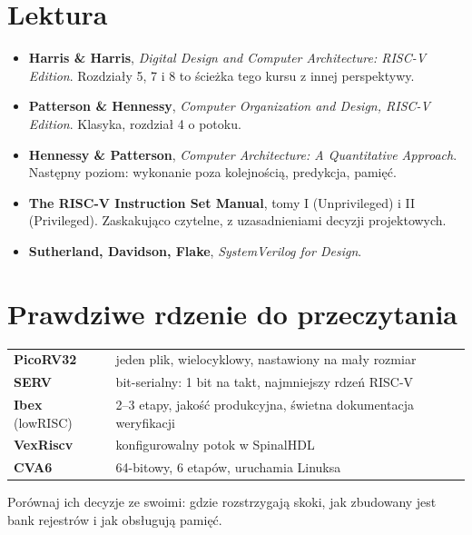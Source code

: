 \section{Lektura}

\begin{itemize}
  \item \textbf{Harris \& Harris}, \emph{Digital Design and Computer Architecture:
    RISC-V Edition}. Rozdziały 5, 7 i 8 to ścieżka tego kursu z innej perspektywy.
  \item \textbf{Patterson \& Hennessy}, \emph{Computer Organization and Design,
    RISC-V Edition}. Klasyka, rozdział 4 o potoku.
  \item \textbf{Hennessy \& Patterson}, \emph{Computer Architecture: A Quantitative
    Approach}. Następny poziom: wykonanie poza kolejnością, predykcja, pamięć.
  \item \textbf{The RISC-V Instruction Set Manual}, tomy I (Unprivileged) i II
    (Privileged). Zaskakująco czytelne, z uzasadnieniami decyzji projektowych.
  \item \textbf{Sutherland, Davidson, Flake}, \emph{SystemVerilog for Design}.
\end{itemize}

\section{Prawdziwe rdzenie do przeczytania}

\begin{center}
\small
\begin{tabularx}{\linewidth}{@{}l X@{}}
\toprule
\textbf{PicoRV32} & jeden plik, wielocyklowy, nastawiony na mały rozmiar \\
\textbf{SERV} & bit-serialny: 1 bit na takt, najmniejszy rdzeń RISC-V \\
\textbf{Ibex} (lowRISC) & 2--3 etapy, jakość produkcyjna, świetna dokumentacja weryfikacji \\
\textbf{VexRiscv} & konfigurowalny potok w SpinalHDL \\
\textbf{CVA6} & 64-bitowy, 6 etapów, uruchamia Linuksa \\
\bottomrule
\end{tabularx}
\end{center}

Porównaj ich decyzje ze swoimi: gdzie rozstrzygają skoki, jak zbudowany jest bank
rejestrów i jak obsługują pamięć.
